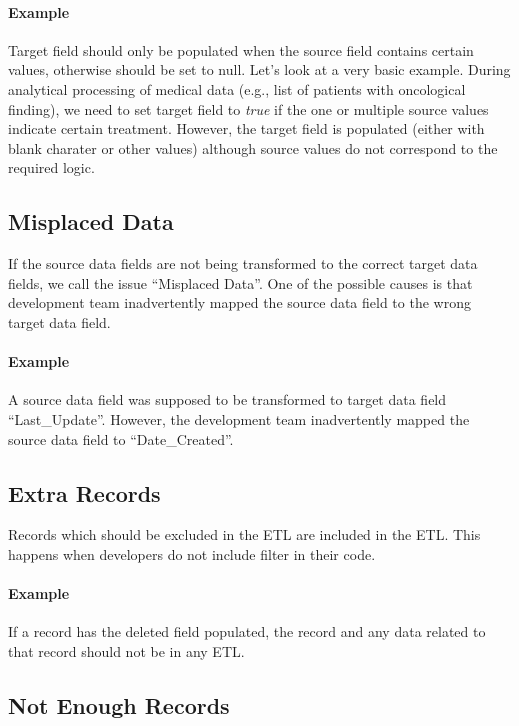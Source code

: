 \paragraph*{Example} Target field should only be populated when the source field contains certain values, otherwise should be set to null.
Let's look at a very basic example.
During analytical processing of medical data (e.g., list of patients with oncological finding), we need to set target field to \textit{true} if the one or multiple source values indicate certain treatment.
However, the target field is populated (either with blank charater or other values) although source values do not correspond to the required logic.

\subsection*{Misplaced Data}

If the source data fields are not being transformed to the correct target data fields, we call the issue \enquote{Misplaced Data}.
One of the possible causes is that development team inadvertently mapped the source data field to the wrong target data field.

\paragraph*{Example} A source data field was supposed to be transformed to target data field \enquote{Last\_Update}.
However, the development team inadvertently mapped the source data field to \enquote{Date\_Created}.

\subsection*{Extra Records}

Records which should be excluded in the ETL are included in the ETL.
This happens when developers do not include filter in their code.

\paragraph*{Example} If a record has the deleted field populated, the record and any data related to that record should not be in any ETL.

\subsection*{Not Enough Records}

